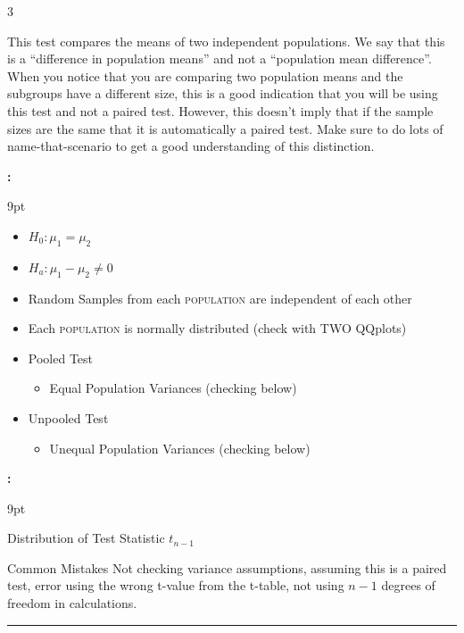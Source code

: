 \documentclass[landscape]{article}
\newcommand{\myline}{\vspace{4pt}\hrule  \vspace{4pt}}
\newcommand{\topic}[2]{
\noindent \textbf{\textsc{\color{harvardcrimson}{#1}}}

\noindent \hspace{-3.5pt}  #2

\myline
}
\newenvironment{tellme}[1]{
\noindent \textbf{\textit{\color{harvardblue}{#1}}:}
\begin{adjustwidth}{9pt}{}
}{
\end{adjustwidth}
}
\newenvironment{compactitem}{
\begin{itemize}[leftmargin=*,labelsep=5pt]
}{
\end{itemize}
}
\newenvironment{compactdesc}{
	\begin{description}[leftmargin=*,labelsep=10pt]
	}{
	\end{description}
}
\begin{document}
\begin{multicols*}{3}
		
		
		\topic{Difference in Population Means}{
			This test compares the means of two independent populations. We say that this is a ``difference in population means'' and not a ``population mean difference''. When you notice that you are comparing two population means and the subgroups have a different size, this is a good indication that you will be using this test and not a paired test. However, this doesn't imply that if the sample sizes are the same that it is automatically a paired test. Make sure to do lots of name-that-scenario to get a good understanding of this distinction.
			
			\begin{tellme}{Assumptions}
				\begin{compactitem}
					\item $ H_0: \mu_1 = \mu_2 $
					\item $ H_a: \mu_1 - \mu_2 \neq 0 $
					\item Random Samples from each \textsc{population} are independent of each other
					\item Each \textsc{population} is normally distributed (check with TWO QQplots)
					\item Pooled Test
					\begin{compactitem}
						\item Equal Population Variances (checking below)
					\end{compactitem}
					\item Unpooled Test
					\begin{compactitem}
						\item Unequal Population Variances (checking below)
					\end{compactitem}
				\end{compactitem}
			\end{tellme}
			
			\begin{tellme}{QuickFacts}
				\begin{compactdesc}
					\item[Distribution of Test Statistic] $ t_{n-1} $
					\item[Common Mistakes] Not checking variance assumptions, assuming this is a paired test, error using the wrong t-value from the t-table, not using $ n-1 $ degrees of freedom in calculations.
				\end{compactdesc}
			\end{tellme}
			
}
\end{multicols*}
\end{document}
